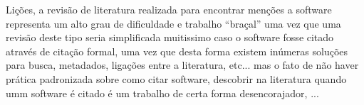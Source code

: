 Lições, a revisão de literatura realizada para encontrar menções a software
representa um alto grau de dificuldade e trabalho ``braçal'' uma vez que uma
revisão deste tipo seria simplificada muitissimo caso o software fosse citado
através de citação formal, uma vez que desta forma existem inúmeras soluções para
busca, metadados, ligações entre a literatura, etc... mas o fato de não haver
prática padronizada sobre como citar software, descobrir na literatura quando
umm software é citado é um trabalho de certa forma desencorajador, ...






%

